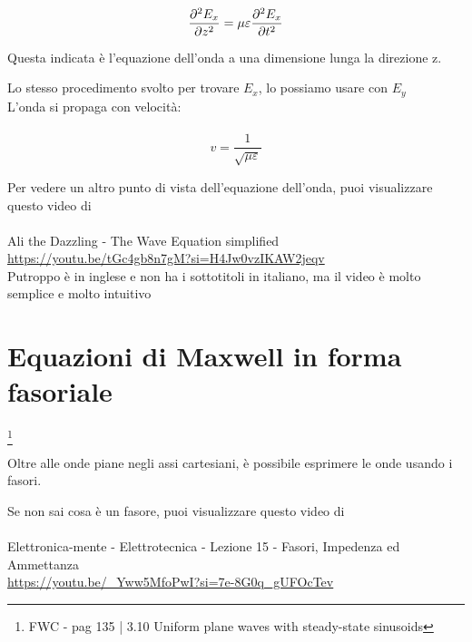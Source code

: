 {
    \Large 
    \begin{equation}
        \pdv[2]{E_x}{z} = \mu \varepsilon \pdv[2]{E_x}{t}   
    \end{equation}
}

Questa indicata è l'equazione dell'onda a una dimensione lunga la direzione z. 

Lo stesso procedimento svolto per trovare $E_x$, lo possiamo usare con $E_y$ \\ 

L'onda si propaga con velocità: \\ \\ 

{
    \Large
    \begin{equation}
        v = \frac{1}{\sqrt{\mu \varepsilon}}
    \end{equation}
}

\begin{tcolorbox}
    Per vedere un altro punto di vista dell'equazione dell'onda, puoi visualizzare questo video di \\ \\
    Ali the Dazzling - The Wave Equation simplified \\ 
    \url{https://youtu.be/tGc4gb8n7gM?si=H4Jw0vzIKAW2jeqv} \\ 

    Putroppo è in inglese e non ha i sottotitoli in italiano, ma il video è molto semplice e molto intuitivo 
\end{tcolorbox}

\newpage 

\section{Equazioni di Maxwell in forma fasoriale}
\footnote{FWC - pag 135 | 3.10 Uniform plane waves with steady-state sinusoids}

Oltre alle onde piane negli assi cartesiani, è possibile esprimere le onde usando i fasori. 

\begin{tcolorbox}
    Se non sai cosa è un fasore, puoi visualizzare questo video di \\ \\ 
    Elettronica-mente - Elettrotecnica - Lezione 15 - Fasori, Impedenza ed Ammettanza \\ 
    \url{https://youtu.be/_Yww5MfoPwI?si=7e-8G0q_gUFOcTev} 

\end{tcolorbox}

